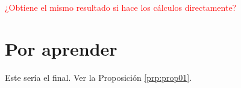 \documentclass[
]{krantz}
\theoremstyle{definition}
\theoremstyle{definition}
\theoremstyle{definition}
\theoremstyle{definition}
\theoremstyle{remark}
\begin{document}
\bigskip

\textcolor{red}{¿Obtiene el mismo resultado si hace los cálculos directamente?}

\cleardoublepage

\hypertarget{appendix-apuxe9ndice-de-prueba}{%
\appendix {}}


\hypertarget{por-aprender}{%
\chapter{Por aprender}\label{por-aprender}}

Este sería el final. Ver la Proposición \ref{prp:prop01}.

  

\backmatter
\printindex
\end{document}
